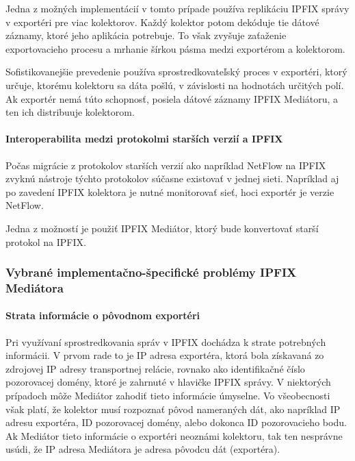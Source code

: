 Jedna z možných implementácií v tomto prípade používa replikáciu IPFIX správy v exportéri 
pre viac kolektorov. Každý kolektor potom dekóduje tie dátové záznamy, ktoré jeho aplikácia
potrebuje. To však zvyšuje zaťaženie exportovacieho procesu a mrhanie šírkou pásma medzi
exportérom a kolektorom.

Sofistikovanejšie prevedenie používa sprostredkovateľský proces v exportéri, ktorý určuje, 
ktorému kolektoru sa dáta pošlú, v závislosti na hodnotách určitých polí. Ak exportér nemá
túto schopnosť, posiela dátové záznamy IPFIX Mediátoru, a ten ich distribuuje kolektorom.

\paragraph{Interoperabilita medzi protokolmi starších verzií a IPFIX}

Počas migrácie z protokolov starších verzií ako napríklad NetFlow \citep{rfc3954} na IPFIX
zvyknú nástroje týchto protokolov súčasne existovať v jednej sieti. Napríklad aj po zavedení 
IPFIX kolektora je nutné monitorovať sieť, hoci exportér je verzie NetFlow.

Jedna z možností je použiť IPFIX Mediátor, ktorý bude konvertovať starší protokol na IPFIX.


\subsubsection{Vybrané implementačno-špecifické problémy IPFIX Mediátora} \label{sec:problems}

\paragraph{Strata informácie o pôvodnom exportéri} \label{sec:loss_info}

Pri využívaní sprostredkovania správ v IPFIX dochádza k strate potrebných informácii. V prvom rade to je 
IP adresa exportéra, ktorá bola získavaná zo zdrojovej IP adresy transportnej relácie, rovnako 
ako identifikačné číslo pozorovacej domény, ktoré je zahrnuté v hlavičke IPFIX správy.
V niektorých prípadoch môže Mediátor zahodiť tieto informácie úmyselne. 
Vo všeobecnosti však platí, že kolektor musí rozpoznať pôvod nameraných dát, ako napríklad IP adresu 
exportéra, ID pozorovacej domény, alebo dokonca ID pozorovacieho bodu. Ak Mediátor tieto informácie 
o exportéri neoznámi kolektoru, tak ten nesprávne usúdi, že IP adresa Mediátora je adresa pôvodcu dát 
(exportéra).

